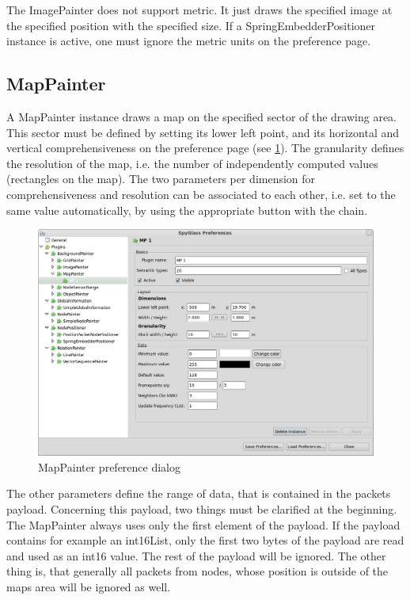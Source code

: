 The ImagePainter does not support metric. It just draws the specified image at the specified position with the specified
size. If a SpringEmbedderPositioner instance is active, one must ignore the metric units
on the preference page.

\subsection{MapPainter}

A MapPainter instance draws a map on the specified sector of the drawing area. This sector must be defined by
setting its lower left point, and its horizontal and vertical comprehensiveness on the preference page (see
\ref{pic:mp_preferences}). The granularity defines the resolution of the map, i.e. the number of independently
computed values (rectangles on the map). The two parameters per dimension for comprehensiveness and resolution can be associated to
each other, i.e. set to the same value automatically, by using the appropriate button with the chain.

\begin{figure}[htb]
  \begin{center}
    \includegraphics[width=13.2cm]{./pics/mappainter_prefpage}
    \caption{MapPainter preference dialog}
    \label{pic:mp_preferences}
  \end{center}
\end{figure}

The other parameters define the range of data, that is contained in the packets payload. Concerning this
payload, two things must be clarified at the beginning. The MapPainter always uses only the first element of the
payload. If the payload contains for example an int16List, only the first two bytes of the payload are read
and used as an int16 value. The rest of the payload will be ignored. The other thing is, that generally all
packets from nodes, whose position is outside of the maps area will be ignored as well.

